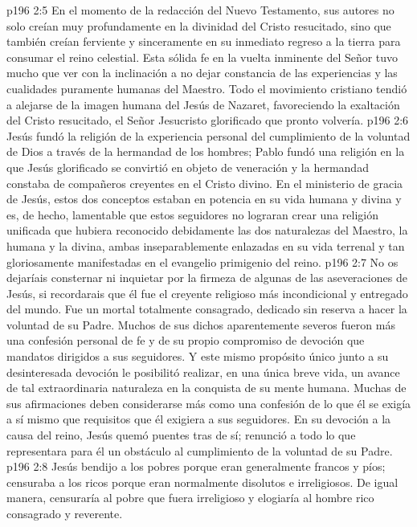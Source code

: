 \vs p196 2:5 En el momento de la redacción del Nuevo Testamento, sus autores no solo creían muy profundamente en la divinidad del Cristo resucitado, sino que también creían ferviente y sinceramente en su inmediato regreso a la tierra para consumar el reino celestial. Esta sólida fe en la vuelta inminente del Señor tuvo mucho que ver con la inclinación a no dejar constancia de las experiencias y las cualidades puramente humanas del Maestro. Todo el movimiento cristiano tendió a alejarse de la imagen humana del Jesús de Nazaret, favoreciendo la exaltación del Cristo resucitado, el Señor Jesucristo glorificado que pronto volvería.
\vs p196 2:6 \pc Jesús fundó la religión de la experiencia personal del cumplimiento de la voluntad de Dios a través de la hermandad de los hombres; Pablo fundó una religión en la que Jesús glorificado se convirtió en objeto de veneración y la hermandad constaba de compañeros creyentes en el Cristo divino. En el ministerio de gracia de Jesús, estos dos conceptos estaban en potencia en su vida humana y divina y es, de hecho, lamentable que estos seguidores no lograran crear una religión unificada que hubiera reconocido debidamente las dos naturalezas del Maestro, la humana y la divina, ambas inseparablemente enlazadas en su vida terrenal y tan gloriosamente manifestadas en el evangelio primigenio del reino.
\vs p196 2:7 No os dejaríais consternar ni inquietar por la firmeza de algunas de las aseveraciones de Jesús, si recordarais que él fue el creyente religioso más incondicional y entregado del mundo. Fue un mortal totalmente consagrado, dedicado sin reserva a hacer la voluntad de su Padre. Muchos de sus dichos aparentemente severos fueron más una confesión personal de fe y de su propio compromiso de devoción que mandatos dirigidos a sus seguidores. Y este mismo propósito único junto a su desinteresada devoción le posibilitó realizar, en una única breve vida, un avance de tal extraordinaria naturaleza en la conquista de su mente humana. Muchas de sus afirmaciones deben considerarse más como una confesión de lo que él se exigía a sí mismo que requisitos que él exigiera a sus seguidores. En su devoción a la causa del reino, Jesús quemó puentes tras de sí; renunció a todo lo que representara para él un obstáculo al cumplimiento de la voluntad de su Padre.
\vs p196 2:8 Jesús bendijo a los pobres porque eran generalmente francos y píos; censuraba a los ricos porque eran normalmente disolutos e irreligiosos. De igual manera, censuraría al pobre que fuera irreligioso y elogiaría al hombre rico consagrado y reverente.
